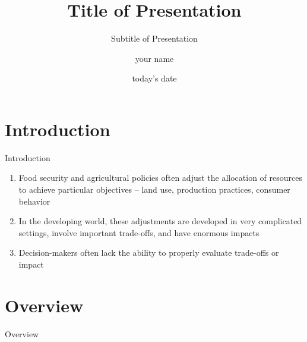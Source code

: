 \documentclass[newPxFont]{beamer}
\title{Title of Presentation}
\subtitle{Subtitle of Presentation}
\date{today's date}
\author{your name}
\institute{University of Illinois}
\begin{document}
%
%

\maketitle


%
%

\section*{Introduction}


\begin{frame}[c]{Introduction}

\begin{enumerate}
\item{Food security and agricultural policies often adjust the allocation of resources to achieve particular objectives -- land use, production practices, consumer behavior}   
\item{In the developing world, these adjustments are developed in very complicated settings, involve important trade-offs, and have enormous impacts}  
\item{Decision-makers often lack the ability to properly evaluate trade-offs or impact}
\end{enumerate}

\end{frame}



\section*{Overview}
\begin{frame}{Overview}
\tableofcontents[hideallsubsections]
\end{frame}


%
%
\end{document}
